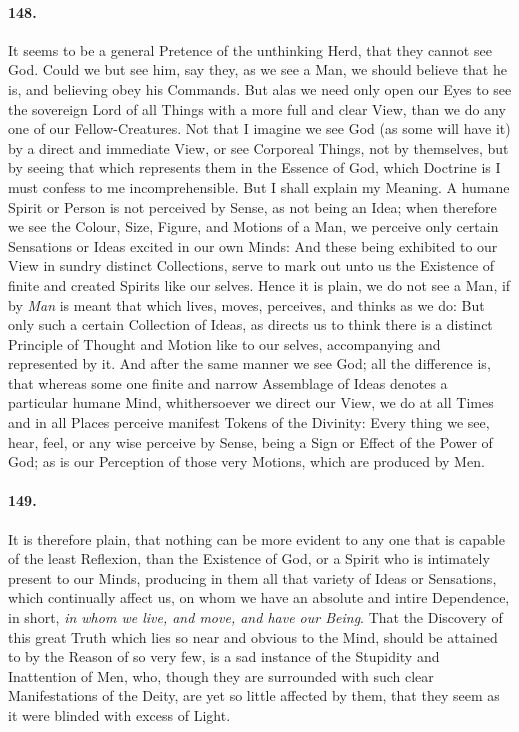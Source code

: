 \documentclass[]{article}
\newenvironment{sectionbody}{}{}
\begin{document}
\begin{sectionbody}
\paragraph{148.} It seems to be a general Pretence of the unthinking Herd, that
they cannot see {\sc God}.  Could we but see him, say they, as we
see a Man, we should believe that he is, and believing obey his
Commands.  But alas we need only open our Eyes to see the
sovereign Lord of all Things with a more full and clear View,
than we do any one of our Fellow-Creatures.  Not that I imagine
we see {\sc God} (as some will have it) by a direct and immediate
View, or see Corporeal Things, not by themselves, but by seeing
that which represents them in the Essence of {\sc God}, which
Doctrine is I must confess to me incomprehensible.  But I shall
explain my Meaning.  A humane Spirit or Person is not perceived
by Sense, as not being an Idea; when therefore we see the Colour,
Size, Figure, and Motions of a Man, we perceive only certain
Sensations or Ideas excited in our own Minds: And these being
exhibited to our View in sundry distinct Collections, serve to
mark out unto us the Existence of finite and created Spirits like
our selves.  Hence it is plain, we do not see a Man, if by {\it
Man} is meant that which lives, moves, perceives, and thinks as
we do: But only such a certain Collection of Ideas, as directs us
to think there is a distinct Principle of Thought and Motion like
to our selves, accompanying and represented by it.  And after the
same manner we see {\sc God}; all the difference is, that whereas
some one finite and narrow Assemblage of Ideas denotes a
particular humane Mind, whithersoever we direct our View, we do
at all Times and in all Places perceive manifest Tokens of the
Divinity: Every thing we see, hear, feel, or any wise perceive by
Sense, being a Sign or Effect of the Power of {\sc God}; as is
our Perception of those very Motions, which are produced by Men.



\paragraph{149.} It is therefore plain, that nothing can be more evident to any
one that is capable of the least Reflexion, than the Existence of
{\sc God}, or a Spirit who is intimately present to our Minds,
producing in them all that variety of Ideas or Sensations, which
continually affect us, on whom we have an absolute and intire
Dependence, in short, \emph{in whom we live, and move, and have
our Being}.  That the Discovery of this great Truth which lies so
near and obvious to the Mind, should be attained to by the Reason
of so very few, is a sad instance of the Stupidity and
Inattention of Men, who, though they are surrounded with such
clear Manifestations of the Deity, are yet so little affected by
them, that they seem as it were blinded with excess of Light.




\end{sectionbody}
\end{document}
